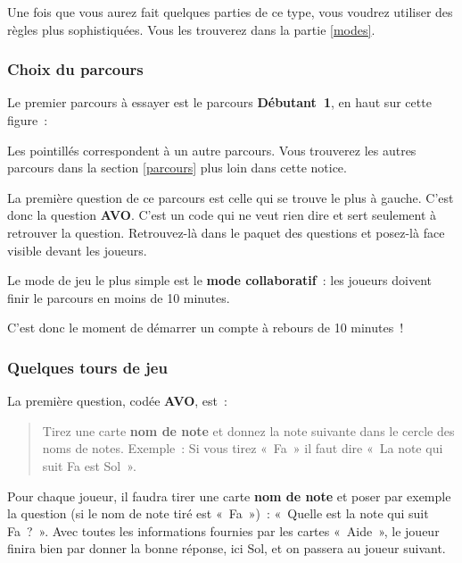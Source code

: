 \documentclass[11pt]{article}
\newcommand{\carte}[1]
{\textbf{#1}}
\newcommand{\parcours}[1]
{\textbf{#1}}
\newcommand{\QST}[1]
{\textbf{#1}}
\newcommand{\AVO}[0]
{Tirez une carte \carte{nom de note} et donnez la note suivante dans le cercle
des noms de notes. Exemple : Si vous tirez « Fa » il faut dire « La note qui
suit Fa est Sol ».}
\newcommand{\mode}[1]
{\textbf{#1}}
\begin{document}
Une fois que vous aurez fait quelques parties de ce type, vous voudrez utiliser
des règles plus sophistiquées. Vous les trouverez dans la partie \ref{modes}.

\subsubsection{Choix du parcours}

Le premier parcours à essayer est le parcours \parcours{Débutant 1}, en haut
sur cette figure :


Les pointillés correspondent à un autre parcours. Vous trouverez les autres
parcours dans la section \ref{parcours} plus loin dans cette notice.

La première question de ce parcours est celle qui se trouve le plus à gauche.
C’est donc la question \QST{AVO}. C’est un code qui ne veut rien dire et sert
seulement à retrouver la question. Retrouvez-là dans le paquet des questions
et posez-là face visible devant les joueurs.

Le mode de jeu le plus simple est le \mode{mode collaboratif} : les joueurs
doivent finir le parcours en moins de 10 minutes.

C’est donc le moment de démarrer un compte à rebours de 10 minutes !

\subsubsection{Quelques tours de jeu}

La première question, codée \QST{AVO}, est :

\begin{quote}
\AVO
\end{quote}

Pour chaque joueur, il faudra tirer une carte \carte{nom de note} et poser par
exemple la question (si le nom de note tiré est « Fa ») : « Quelle est la note
qui suit Fa ? ». Avec toutes les informations fournies par les cartes
« Aide », le joueur finira bien par donner la bonne réponse, ici Sol, et on
passera au joueur suivant.
\end{document}
